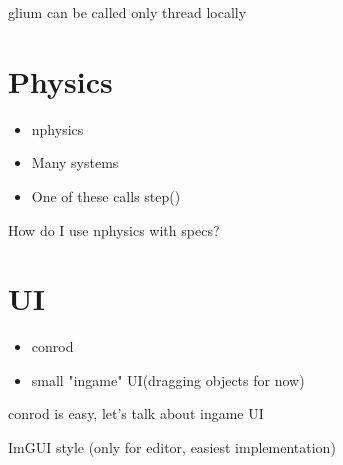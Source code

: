 \documentclass{beamer}
\begin{document}
    \begin{frame}
      \RendererDispatch
      glium can be called only thread locally
    \end{frame}

    \section{Physics}

    \begin{frame}
      \begin{itemize}
        \item nphysics
        \item Many systems
        \item One of these calls step()
      \end{itemize}
      How do I use nphysics with specs?
    \end{frame}

    \begin{frame}
      \RetainedStorage
    \end{frame}

    \begin{frame}
      \nphysics
    \end{frame}

    \begin{frame}
      \safemaintain
    \end{frame}

    \section{UI}

    \begin{frame}
      \begin{itemize}
        \item conrod
        \item small "ingame" UI(dragging objects for now)
      \end{itemize}
      conrod is easy, let's talk about ingame UI
    \end{frame}

    \begin{frame}
      ImGUI style (only for editor, easiest implementation)
      \IngameUI
    \end{frame}

    \begin{frame}
      \DrawPrimitives
    \end{frame}
\end{document}
